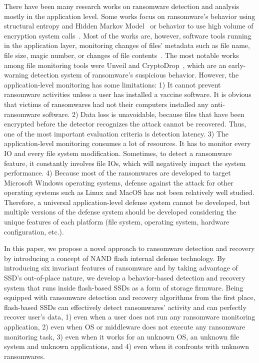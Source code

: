 \documentclass[conference]{IEEEtran}
\begin{document}
There have been many research works on ransomware detection and
analysis mostly in the application level.  Some works focus on
ransomware's behavior using structural entropy and Hidden Markov
Model~\cite{canfora16} or behavior to use high volume of encryption
system calls~\cite{andronio15}.  Most of the works are, however,
software tools running in the application layer, monitoring changes
of files' metadata such as file name, file size, magic number, or
changes of file contents~\cite{scaife16,andronio15,kim94}.  The
most notable works among file monitoring tools were Unveil and
CryptoDrop~\cite{scaife16,kharaz}, which are an early-warning
detection system of ransomware's suspicious behavior.  However, the
application-level monitoring has some limitations: 1) It cannot
prevent ransomware activities unless a user has installed a vaccine
software. It is obvious that victims of ransomwares had not their
computers installed any anti-ransomware software. 2) Data loss is
unavoidable, because files that have been encrypted before the
detector recognizes the attack cannot be recovered. Thus, one of
the most important evaluation criteria is detection latency.  3)
The application-level monitoring consumes a lot of resources. It
has to monitor every IO and every file system modification.
Sometimes, to detect a ransomware feature, it constantly involves
file IOs, which will negatively impact the system performance. 4)
Because most of the ransomwares are developed to target Microsoft
Windows operating systems, defense against the attack for other
operating systems such as Linux and MacOS has not been relatively
well studied.  Therefore, a universal application-level defense
system cannot be developed, but multiple versions of the defense
system should be developed considering the unique features of each
platform (file system, operating system, hardware configuration,
etc.).  

In this paper, we propose a novel approach to ransomware detection
and recovery by introducing a concept of NAND flash internal
defense technology.  By introducing six invariant features of
ransomware and by taking advantage of SSD's out-of-place nature, we
develop a behavior-based detection and recovery system that runs
inside flash-based SSDs as a form of storage firmware.  Being
equipped with ransomware detection and recovery algorithms from the
first place, flash-based SSDs can effectively detect ransomwares'
activity and can perfectly recover user's data,
1) even when a user does not run any ransomware monitoring application,
2) even when OS or middleware does not execute any ransomware monitoring task,
3) even when it works for an unknown OS, an unknown file system and unknown applications, and
4) even when it confronts with unknown ransomwares.
\end{document}
